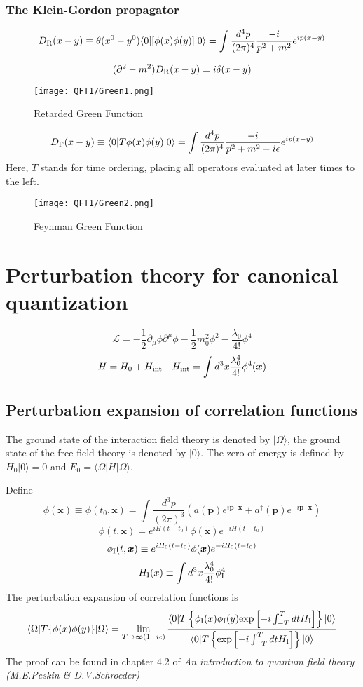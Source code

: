 \subsubsection{The Klein-Gordon propagator}
\[D_{\rm R}(x-y) \equiv \theta(x^0-y^0) \langle 0 | [\phi(x) \phi(y)] | 0 \rangle = \int \frac{d^4 p}{(2\pi)^4} \frac{-i}{p^2+m^2} e^{ip(x-y)}\]

\[(\partial^2-m^2) D_{\rm R}(x-y) = i \delta(x-y)\]

\begin{figure}[!h]
\centering
\texttt{[image: QFT1/Green1.png]}
\caption{Retarded Green Function}
\end{figure}

\[D_{\rm F}(x-y) \equiv \langle 0 | T\phi(x) \phi(y) | 0 \rangle = \int \frac{d^4 p}{(2\pi)^4} \frac{-i}{p^2+m^2-i\epsilon} e^{ip(x-y)}\]
Here, $T$ stands for time ordering, placing all operators evaluated at later times to the left.
\begin{figure}[!h]
\centering
\texttt{[image: QFT1/Green2.png]}
\caption{Feynman Green Function}
\end{figure}

\section{Perturbation theory for canonical quantization}
\[\mathcal{L} = -\frac{1}{2}\partial_{\mu} \phi \partial^{\mu} \phi -\frac{1}{2}m_0^2 \phi^2 -\frac{\lambda_0}{4!}\phi^4\]
\[H = H_0 + H_{\rm int} \quad H_{\rm int} = \int d^3 x \frac{\lambda_0^4}{4!} \phi^4 (\bm{x})\]

\subsection{Perturbation expansion of correlation functions}
\begin{note}
The ground state of the interaction field theory is denoted by $| \Omega \rangle$, the ground state of the free field theory is denoted by $| 0 \rangle$. The zero of energy is defined by $H_0 | 0 \rangle =0$ and $E_0 = \langle \Omega | H | \Omega \rangle$.
\end{note}
Define
\[\phi(\bm{x}) \equiv \phi(t_0,\bm{x}) = \int \frac{d^3p}{(2\pi)^3}( a(\bm{p})e^{i\bm{p}\cdot\bm{x}} + a^{\dagger}(\bm{p})e^{-i\bm{p}\cdot\bm{x}})\]
\[\phi(t,\bm{x}) = e^{iH(t-t_0)} \phi(\bm{x}) e^{-iH(t-t_0)}\]
\[\phi_{\rm I}(t,\bm{x}) \equiv e^{iH_0(t-t_0)} \phi(\bm{x}) e^{-iH_0(t-t_0)}\]
\[H_{\rm I}(x) \equiv \int d^3x \frac{\lambda_0^4}{4!} \phi_{\rm I}^4\]
The perturbation expansion of correlation functions is
\[\langle \Omega | T \{ \phi(x) \phi(y) \} | \Omega \rangle = \lim_{T \to \infty(1-i\epsilon)} \frac{\langle 0 | T \left\{ \phi_{\rm I}(x) \phi_{\rm I}(y) \mathrm{exp} \left[ -i \int_{-T}^{T} dt H_{\rm I} \right]\right\} | 0 \rangle}{\langle 0 | T \left\{ \mathrm{exp} \left[ -i \int_{-T}^{T} dt H_{\rm I} \right]\right\} | 0 \rangle}\]
The proof can be found in chapter 4.2 of \emph{An introduction to quantum field theory (M.E.Peskin \& D.V.Schroeder)}
\\

